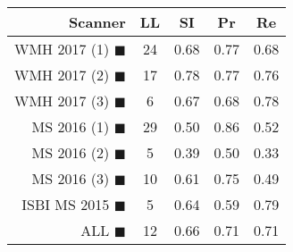 \begin{tabular}{rcccc}
\toprule
Scanner & LL & SI & Pr & Re \\
\midrule
WMH 2017 (1) {\color[rgb]{ 1.00 0.00 0.00}$\blacksquare$} & 24 & 0.68 & 0.77 & 0.68 \\
WMH 2017 (2) {\color[rgb]{ 1.00 0.50 0.00}$\blacksquare$} & 17 & 0.78 & 0.77 & 0.76 \\
WMH 2017 (3) {\color[rgb]{ 1.00 0.80 0.00}$\blacksquare$} & 6 & 0.67 & 0.68 & 0.78 \\
MS  2016 (1) {\color[rgb]{ 0.20 0.80 0.00}$\blacksquare$} & 29 & 0.50 & 0.86 & 0.52 \\
MS  2016 (2) {\color[rgb]{ 0.00 0.40 1.00}$\blacksquare$} & 5 & 0.39 & 0.50 & 0.33 \\
MS  2016 (3) {\color[rgb]{ 0.60 0.00 1.00}$\blacksquare$} & 10 & 0.61 & 0.75 & 0.49 \\
ISBI MS 2015 {\color[rgb]{ 1.00 0.00 1.00}$\blacksquare$} & 5 & 0.64 & 0.59 & 0.79 \\
\midrule
ALL {\color[rgb]{ 1.00 1.00 1.00}$\blacksquare$} & 12 & 0.66 & 0.71 & 0.71 \\
\bottomrule
\end{tabular}